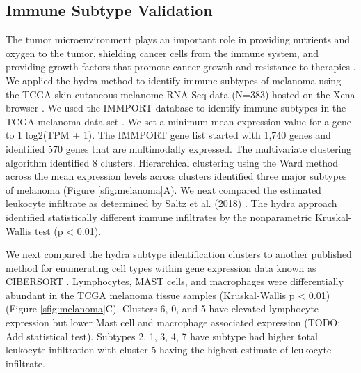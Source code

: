 \documentclass[fleqn,10pt]{wlscirep}
\begin{document}
\subsection*{Immune Subtype Validation}
The tumor microenvironment plays an important role in providing nutrients and oxygen to the tumor, shielding cancer cells from the immune system, and providing growth factors that promote cancer growth and resistance to therapies \cite{hanahan2012accessories}. We applied the hydra method to identify immune subtypes of melanoma using the TCGA skin cutaneous melanome RNA-Seq data (N=383) hosted on the Xena browser \cite{vivian2017toil}. We used the IMMPORT database to identify immune subtypes in the TCGA melanoma data set \cite{bhattacharya2018immport}. We set a minimum mean expression value for a gene to 1 log2(TPM + 1). The IMMPORT gene list started with 1,740 genes and identified 570 genes that are multimodally expressed. The multivariate clustering algorithm identified 8 clusters. Hierarchical clustering using the Ward method across the mean expression levels across clusters identified three major subtypes of melanoma (Figure \ref{sfig:melanoma}A). We next compared the estimated leukocyte infiltrate as determined by Saltz et al. (2018) \cite{saltz2018spatial}. The hydra approach identified statistically different immune infiltrates by the nonparametric Kruskal-Wallis test (p < 0.01).

We next compared the hydra subtype identification clusters to another published method for enumerating cell types within gene expression data known as CIBERSORT \cite{newman2015robust}. Lymphocytes, MAST cells, and macrophages were differentially abundant in the TCGA melanoma tissue samples (Kruskal-Wallis p < 0.01) (Figure \ref{sfig:melanoma}C). Clusters 6, 0, and 5 have elevated lymphocyte expression but lower Mast cell and macrophage associated expression (TODO: Add statistical test). Subtypes 2, 1, 3, 4, 7 have subtype had higher total leukocyte infiltration with cluster 5 having the highest estimate of leukocyte infiltrate.


\end{document}
